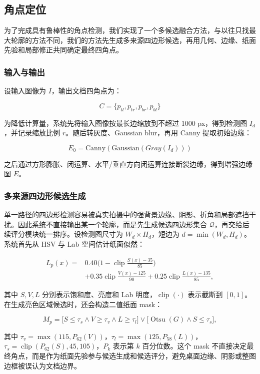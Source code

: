 \documentclass[letterpaper]{article}
\begin{document}
\subsection{角点定位}

为了完成具有鲁棒性的角点检测，我们实现了一个多候选融合方法，与以往只找最大轮廓的方法不同，我们的方法先生成多来源四边形候选，再用几何、边缘、纸面先验和局部修正共同确定最终四角点。

\subsubsection{输入与输出}

设输入图像为 $I$，输出文档四角点为：

\[
C=\{p_{tl},p_{tr},p_{br},p_{bl}\}
\]

为降低计算量，系统先将输入图像按最长边缩放到不超过 1000 px，得到检测图 \(I_d\)，并记录缩放比例 \(r\)。随后转灰度、Gaussian blur，再用 Canny 提取初始边缘：

\[
E_0 = \mathrm{Canny}(\mathrm{Gaussian}(Gray(I_d)))
\]

之后通过方形膨胀、闭运算、水平/垂直方向闭运算连接断裂边缘，得到增强边缘图 \(E\)。

\subsubsection{多来源四边形候选生成}

单一路径的四边形检测容易被真实拍摄中的强背景边缘、阴影、折角和局部遮挡干扰。因此系统不直接输出某一个轮廓，而是先生成候选四边形集合 \(\mathcal{Q}\)，再交给后续评分模块统一排序。设检测图尺寸为 \(W_d\times H_d\)，短边为 \(d=\min(W_d,H_d)\)。系统首先从 HSV 与 Lab 空间估计纸面似然：

\[
\begin{aligned}
L_p(x)={}&0.40\Big(1-\operatorname{clip}\frac{S(x)-35}{85}\Big)
\\
&+0.35\operatorname{clip}\frac{V(x)-125}{90}
+0.25\operatorname{clip}\frac{L(x)-135}{85},
\end{aligned}
\]

其中 \(S,V,L\) 分别表示饱和度、亮度和 Lab 明度，\(\operatorname{clip}(\cdot)\) 表示截断到 \([0,1]\)。在生成亮色区域候选时，还会构造二值纸面 mask：

\[
M_p=\big[S\leq\tau_s \land V\geq\tau_v \land L\geq\tau_l\big]
\lor \big[\operatorname{Otsu}(G)\land S\leq\tau_s\big],
\]

其中 \(\tau_v=\max(115,P_{62}(V))\)，\(\tau_l=\max(125,P_{58}(L))\)，\(\tau_s=\operatorname{clip}(P_{62}(S),45,105)\)，\(P_k\) 表示第 \(k\) 百分位数。这个 mask 不直接决定最终角点，而是作为纸面先验参与候选生成和候选评分，避免桌面边缘、阴影或整图边框被误认为文档边界。
\end{document}
